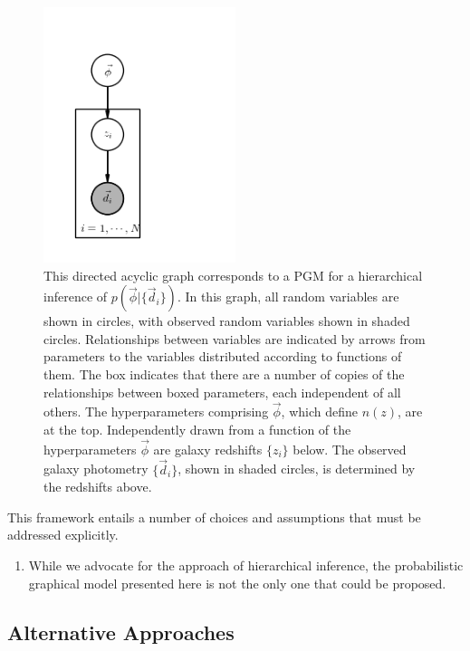 \documentclass[iop]{emulateapj}
\begin{document}
\begin{figure}
	\begin{center}
		\includegraphics[width=0.5\textwidth]{pgm.png}
		\caption{This directed acyclic graph corresponds to a PGM for a hierarchical inference of $p(\vec{\phi}|\{\vec{d}_{i}\})$.  In this graph, all random variables are shown in circles, with observed random variables shown in shaded circles.  Relationships between variables are indicated by arrows from parameters to the variables distributed according to functions of them.  The box indicates that there are a number of copies of the relationships between boxed parameters, each independent of all others.  The hyperparameters comprising $\vec{\phi}$, which define $n(z)$, are at the top.  Independently drawn from a function of the hyperparameters $\vec{\phi}$ are galaxy redshifts $\{z_{i}\}$ below.  The observed galaxy photometry $\{\vec{d}_{i}\}$, shown in shaded circles, is determined by the redshifts above.}
	\label{fig:pgm}
	\end{center}
\end{figure}



This framework entails a number of choices and assumptions that must be addressed explicitly.

\begin{enumerate}
	\item While we advocate for the approach of hierarchical inference, the probabilistic graphical model presented here is not the only one that could be proposed.
\end{enumerate}

\subsection{Alternative Approaches}
\label{sec:others}
\end{document}
